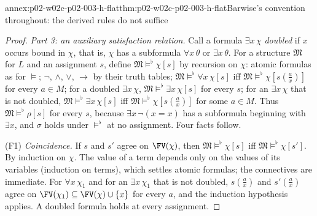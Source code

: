 \begin{annexitem}{annex:p02-w02c-p02-003-h-flat}{thm:p02-w02c-p02-003-h-flat}{Barwise's convention throughout: the derived rules do not suffice}
\begin{proof}
\emph{Part 3: an auxiliary satisfaction relation.}  Call a formula
\(\exists x\,\chi\) \emph{doubled} if \(x\) occurs bound in \(\chi\), that
is, \(\chi\) has a subformula \(\forall x\,\theta\) or \(\exists x\,\theta\).
For a structure \(\mathfrak M\) for \(L\) and an assignment \(s\), define
\(\mathfrak M\models^{\flat}\chi[s]\) by recursion on \(\chi\): atomic
formulas as for \(\models\); \(\neg\), \(\land\), \(\lor\), \(\to\) by
their truth tables; \(\mathfrak M\models^{\flat}\forall x\,\chi[s]\) iff
\(\mathfrak M\models^{\flat}\chi[s(\tfrac ax)]\) for every \(a\in M\); for a
doubled \(\exists x\,\chi\), \(\mathfrak M\models^{\flat}\exists x\,\chi[s]\)
for every \(s\); for an \(\exists x\,\chi\) that is not doubled,
\(\mathfrak M\models^{\flat}\exists x\,\chi[s]\) iff
\(\mathfrak M\models^{\flat}\chi[s(\tfrac ax)]\) for some \(a\in M\).  Thus
\(\mathfrak M\models^{\flat}\rho[s]\) for every \(s\), because
\(\exists x\,\neg(x=x)\) has a subformula beginning with \(\exists x\), and
\(\sigma\) holds under \(\models^{\flat}\) at no assignment.  Four facts
follow.

(F1) \emph{Coincidence.}  If \(s\) and \(s'\) agree on \(\FV(\chi)\), then
\(\mathfrak M\models^{\flat}\chi[s]\) iff \(\mathfrak M\models^{\flat}\chi[s']\).
By induction on \(\chi\).  The value of a term depends only on the values of
its variables (induction on terms), which settles atomic formulas; the
connectives are immediate.  For \(\forall x\,\chi_1\) and for an
\(\exists x\,\chi_1\) that is not doubled, \(s(\tfrac ax)\) and
\(s'(\tfrac ax)\) agree on \(\FV(\chi_1)\subseteq\FV(\chi)\cup\{x\}\) for
every \(a\), and the induction hypothesis applies.  A doubled formula holds
at every assignment.


\end{proof}
\end{annexitem}
